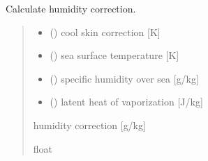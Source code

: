 \documentclass[letterpaper,10pt,english]{sphinxmanual}
\begin{document}

\begin{fulllineitems}
\label{\detokenize{users_guide:AirSeaFluxCode.cs_wl_subs.get_dqer}}
\pysigstartsignatures
\pysiglinewithargsret
{}
{\sphinxparamcomma {}\sphinxparamcomma {}\sphinxparamcomma {}}
{}
\pysigstopsignatures
\sphinxAtStartPar
Calculate humidity correction.
\begin{quote}\begin{description}
\begin{itemize}
\item {}
\sphinxAtStartPar
{} () \textendash{} cool skin correction         {[}K{]}

\item {}
\sphinxAtStartPar
{} () \textendash{} sea surface temperature      {[}K{]}

\item {}
\sphinxAtStartPar
{} () \textendash{} specific humidity over sea   {[}g/kg{]}

\item {}
\sphinxAtStartPar
{} () \textendash{} latent heat of vaporization   {[}J/kg{]}

\end{itemize}

\sphinxAtStartPar
{} \textendash{} humidity correction            {[}g/kg{]}

\sphinxAtStartPar
float

\end{description}\end{quote}

\end{fulllineitems}

\end{document}

